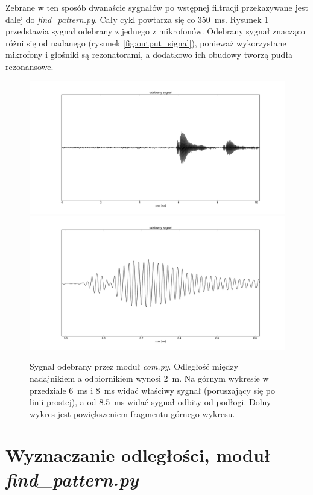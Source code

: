 Zebrane w ten sposób dwanaście sygnałów po wstępnej filtracji przekazywane jest dalej do \textit{find\_pattern.py}. Cały cykl powtarza 
się co \SI{350}{ms}.
Rysunek \ref{fig:com_output_2m} przedstawia sygnał odebrany z jednego z mikrofonów.
Odebrany sygnał znacząco różni się od nadanego (rysunek \ref{fig:output_signal}),
ponieważ wykorzystane mikrofony i głośniki są rezonatorami, a dodatkowo 
ich obudowy tworzą pudła rezonansowe.


\begin{figure}[p]
    \centering
    \includegraphics[width=1.0\textwidth, trim= 50mm 0mm 40mm 0mm,clip]{com_output_2m_1}
    \includegraphics[width=1.0\textwidth, trim= 50mm 0mm 40mm 0mm,clip]{com_output_2m_2}
    \caption{Sygnał odebrany przez moduł \textit{com.py}. 
    Odległość między nadajnikiem a odbiornikiem wynosi \SI{2}{m}.
    Na górnym wykresie w przedziale \SI{6}{ms} i \SI{8}{ms} widać właściwy sygnał (poruszający się po linii prostej), a od \SI{8.5}{ms}
   widać sygnał odbity od podłogi. 
    Dolny wykres jest powiększeniem fragmentu górnego wykresu.}
    \label{fig:com_output_2m}
\end{figure}

\section{Wyznaczanie odległości, moduł \textit{find\_pattern.py}}

